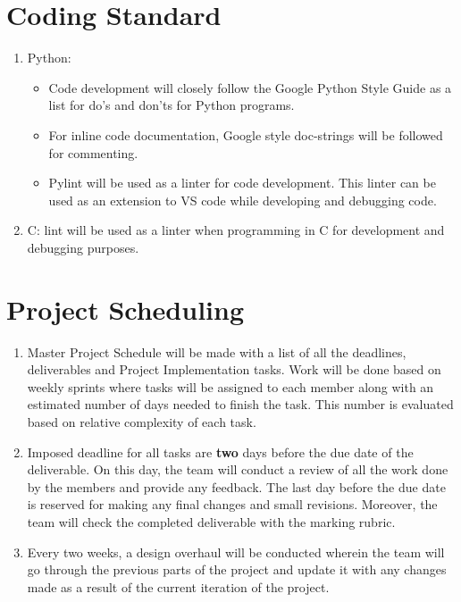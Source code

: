 \documentclass{article}
\begin{document}
\section{Coding Standard}
\begin{enumerate}
\item Python:
\begin{itemize} 
\item Code development will closely follow the Google Python Style Guide as a list for do's and don'ts for Python programs.
\item For inline code documentation, Google style doc-strings will be followed for commenting.
\item Pylint will be used as a linter for code development. This linter can be used as an extension to VS code while developing and debugging code.
\end{itemize}
\item C: lint will be used as a linter when programming in C for development and debugging purposes.
\end{enumerate}

\section{Project Scheduling}

\begin{enumerate}
\item Master Project Schedule will be made with a list of all the deadlines, deliverables and Project Implementation tasks. Work will be done based on weekly sprints where tasks will be assigned to each member along with an estimated number of days needed to finish the task. This number is evaluated based on relative complexity of each task.\\

\item Imposed deadline for all tasks are \textbf{two} days before the due date of the deliverable. On this day, the team will conduct a review of all the work done by the members and provide any feedback. The last day before the due date is reserved for making any final changes and small revisions. Moreover, the team will check the completed deliverable with the marking rubric.\\

\item Every two weeks, a design overhaul will be conducted wherein the team will go through the previous parts of the project and update it with any changes made as a result of the current iteration of the project.\\
\end{enumerate}
\end{document}

